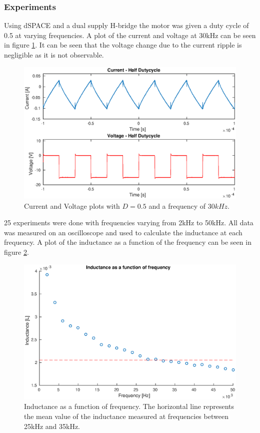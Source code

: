 \subsubsection{Experiments}
Using dSPACE and a dual supply H-bridge the motor was given a duty cycle of 0.5 at varying frequencies.
A plot of the current and voltage at 30kHz can be seen in figure \ref{fig:half_duty}.
It can be seen that the voltage change due to the current ripple is negligible as it is not observable.


\begin{figure}[!h]
	\centering
	\includegraphics[width=.75\linewidth]{graphics/half_duty}
	\caption{Current and Voltage plots with $D = 0.5$ and a frequency of $30kHz$.}
	\label{fig:half_duty}
\end{figure}

25 experiments were done with frequencies varying from 2kHz to 50kHz.
All data was measured on an oscilloscope and used to calculate the inductance at each frequency.
A plot of the inductance as a function of the frequency can be seen in figure \ref{fig:inductance_freq}.

\begin{figure}[!h]
	\centering
	\includegraphics[width=.75\linewidth]{graphics/l_freq}
	\caption{Inductance as a function of frequency. The horizontal line represents the mean value of the inductance measured at frequencies between 25kHz and 35kHz.}
	\label{fig:inductance_freq}
\end{figure}

